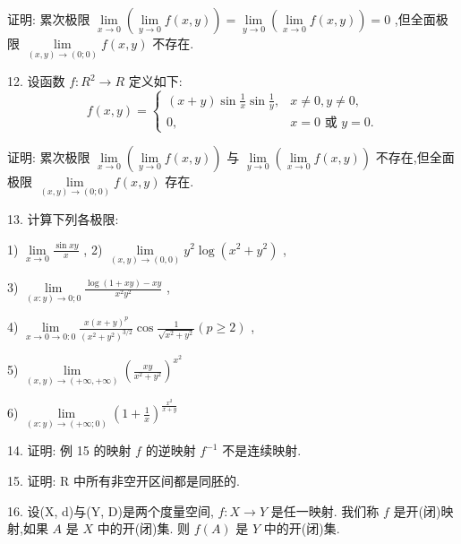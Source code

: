 证明: 累次极限 $\mathop{\lim }\limits_{{x \rightarrow  0}}\left( {\mathop{\lim }\limits_{{y \rightarrow  0}}f\left( {x,y}\right) }\right)  = \mathop{\lim }\limits_{{y \rightarrow  0}}\left( {\mathop{\lim }\limits_{{x \rightarrow  0}}f\left( {x,y}\right) }\right)  = 0$ ,但全面极限 $\mathop{\lim }\limits_{{\left( {x,y}\right)  \rightarrow  \left( {0;0}\right) }}f\left( {x,y}\right)$ 不存在.

12. 设函数 $f : {R}^{2} \rightarrow  R$ 定义如下:
$$f\left( {x,y}\right)  = \left\{  \begin{matrix} \left( {x + y}\right) \sin \frac{1}{x}\sin \frac{1}{y}, & x \neq  0,y \neq  0, \\  0, & x = 0\text{ 或 }y = 0. \end{matrix}\right.$$

证明: 累次极限 $\mathop{\lim }\limits_{{x \rightarrow  0}}\left( {\mathop{\lim }\limits_{{y \rightarrow  0}}f\left( {x,y}\right) }\right)$ 与 $\mathop{\lim }\limits_{{y \rightarrow  0}}\left( {\mathop{\lim }\limits_{{x \rightarrow  0}}f\left( {x,y}\right) }\right)$ 不存在,但全面极限 $\mathop{\lim }\limits_{{\left( {x,y}\right)  \rightarrow  \left( {0;0}\right) }}f\left( {x,y}\right)$ 存在.

13. 计算下列各极限:

1) $\mathop{\lim }\limits_{{x \rightarrow  0}}\frac{\sin {xy}}{x}$ , 2) $\mathop{\lim }\limits_{{\left( {x,y}\right)  \rightarrow  \left( {0,0}\right) }}{y}^{2}\log \left( {{x}^{2} + {y}^{2}}\right)$ ,

3) $\mathop{\lim }\limits_{{\left( {x : y}\right)  \rightarrow  0;0}}\frac{\log \left( {1 + {xy}}\right)  - {xy}}{{x}^{2}{y}^{2}}$ ,

4) $\mathop{\lim }\limits_{{x \rightarrow  0 \rightarrow  0 : 0}}\frac{x{\left( x + y\right) }^{p}}{{\left( {x}^{2} + {y}^{2}\right) }^{3/2}}\cos \frac{1}{\sqrt{{x}^{2} + {y}^{2}}}\left( {p \geq  2}\right)$ ,

5) $\mathop{\lim }\limits_{{\left( {x,y}\right)  \rightarrow  \left( {+\infty , + \infty }\right) }}{\left( \frac{xy}{{x}^{2} + {y}^{2}}\right) }^{{x}^{2}}$

6) $\mathop{\lim }\limits_{{\left( {x : y}\right)  \rightarrow  \left( {+\infty ;0}\right) }}{\left( 1 + \frac{1}{x}\right) }^{\frac{{x}^{2}}{x + y}}$

14. 证明: 例 15 的映射 $f$ 的逆映射 ${f}^{-1}$ 不是连续映射.

15. 证明: $\mathrm{R}$ 中所有非空开区间都是同胚的.

16. 设(X, d)与(Y, D)是两个度量空间, $f : X \rightarrow  Y$ 是任一映射. 我们称 $f$ 是开(闭)映射,如果 $A$ 是 $X$ 中的开(闭)集. 则 $f\left( A\right)$ 是 $Y$ 中的开(闭)集.

